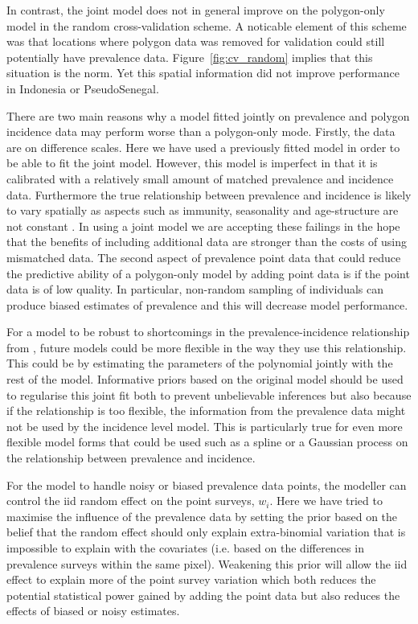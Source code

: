 \documentclass[10pt,letterpaper]{article}
\begin{document}
In contrast, the joint model does not in general improve on the polygon-only model in the random cross-validation scheme.
A noticable element of this scheme was that locations where polygon data was removed for validation could still potentially have prevalence data.
Figure~\ref{fig:cv_random} implies that this situation is the norm.
Yet this spatial information did not improve performance in Indonesia or PseudoSenegal.



There are two main reasons why a model fitted jointly on prevalence and polygon incidence data may perform worse than a polygon-only mode.
Firstly, the data are on difference scales.
Here we have used a previously fitted model \cite{cameron2015defining} in order to be able to fit the joint model.
However, this model is imperfect in that it is calibrated with a relatively small amount of matched prevalence and incidence data.
Furthermore the true relationship between prevalence and incidence is likely to vary spatially as aspects such as immunity, seasonality and age-structure are not constant \cite{cameron2015defining, battle2015defining,reiner2015seasonality}.
In using a joint model we are accepting these failings in the hope that the benefits of including additional data are stronger than the costs of using mismatched data.
The second aspect of prevalence point data that could reduce the predictive ability of a polygon-only model by adding point data is if the point data is of low quality.
In particular, non-random sampling of individuals can produce biased estimates of prevalence and this will decrease model performance.


For a model to be robust to shortcomings in the prevalence-incidence relationship from \cite{cameron2015defining}, future models could be more flexible in the way they use this relationship.
This could be by estimating the parameters of the polynomial jointly with the rest of the model.
Informative priors based on the original model should be used to regularise this joint fit both to prevent unbelievable inferences but also because if the relationship is too flexible, the information from the prevalence data might not be used by the incidence level model.
This is particularly true for even more flexible model forms that could be used such as a spline or a Gaussian process on the relationship between prevalence and incidence.

For the model to handle noisy or biased prevalence data points, the modeller can control the iid random effect on the point surveys, $w_i$. 
Here we have tried to maximise the influence of the prevalence data by setting the prior based on the belief that the random effect should only explain extra-binomial variation that is impossible to explain with the covariates (i.e. based on the differences in prevalence surveys within the same pixel).
Weakening this prior will allow the iid effect to explain more of the point survey variation which both reduces the potential statistical power gained by adding the point data but also reduces the effects of biased or noisy estimates.
\end{document}
